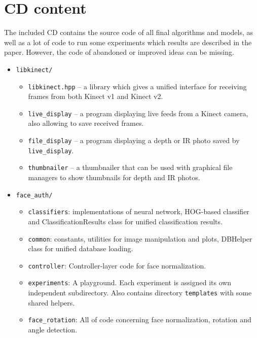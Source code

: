 \chapter{CD content}
    The included CD contains the source code of all final algorithms
    and models, as well as a lot of code to run some experiments
    which results are described in the paper.
    However, the code of abandoned or improved ideas can be missing.

    \begin{itemize}
        \item \texttt{libkinect/}
        \begin{itemize}
            \item \texttt{libkinect.hpp} -- a library which gives a unified interface
                  for receiving frames from both Kinect v1 and Kinect v2.
            \item \texttt{live\_display} -- a program displaying live feeds from a Kinect
                  camera, also allowing to save received frames.
            \item \texttt{file\_display} -- a program displaying a depth or IR photo saved
                  by \texttt{live\_display}.
            \item \texttt{thumbnailer} -- a thumbnailer that can be used with graphical
                  file managers to show thumbnails for depth and IR photos.
        \end{itemize}
        \item \texttt{face\_auth/}
        \begin{itemize}
            \item \texttt{classifiers}: implementations of neural network,
                  HOG-based classifier and ClassificationResults class for
                  unified classification results.
            \item \texttt{common}: constants, utilities for image manipulation and plots,
                  DBHelper class for unified database loading.
            \item \texttt{controller}: Controller-layer code for face normalization.
            \item \texttt{experiments}: A playground. Each experiment is assigned its
                  own independent subdirectory. Also contains directory \texttt{templates}
                  with some shared helpers.
            \item \texttt{face\_rotation}: All of code concerning face normalization, rotation
                  and angle detection.

\end{itemize}
\end{itemize}
